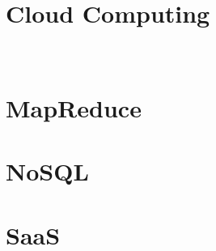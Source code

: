 \part{Cloud Computing}


\FILENAME\

%

%





\part{MapReduce}



\part{NoSQL}



\part{SaaS}
\label{sec:icloud-saas}



%
%

